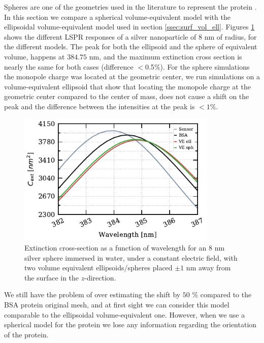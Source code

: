 Spheres are one of the geometries used in the literature to represent the protein \cite{SantiagoCordobaETal2011, UngerETal2009}. In this 
section we compare a spherical volume-equivalent model with the ellipsoidal volume-equivalent model used in section
\ref{ssec:surf_vol_ell}. Figures \ref{fig:sph_vs_ell_ve} shows the different LSPR responses of a silver nanoparticle of $8$ nm of radius, 
for the different models. The peak for both the ellipsoid and the sphere of equivalent volume, happens at $384.75$ nm, and the 
maximum extinction cross section is nearly the same for both cases (difference $<$0.5$\%$). For the sphere simulations 
the monopole charge was located at the geometric center, we run simulations on a volume-equivalent ellipsoid that show 
that locating the monopole charge at the geometric center compared to the center of mass, does not cause a shift on the peak 
and the difference between the intensities at the peak is $<1\%$.


\begin{figure} %
    \centering
    \includegraphics[width=0.85\textwidth]{two_ve_ell_sph_vs_BSA.pdf} 
    \caption{Extinction cross-section as a function of wavelength for an $8$ nm
    silver sphere immersed in water, under a constant electric field, with two volume equivalent 
    ellipsoids/spheres placed $\pm 1$ nm away from the surface in the $z$-direction.}
    \label{fig:sph_vs_ell_ve}
 \end{figure}

We still have the problem of over estimating the shift by $50$ $\%$ compared to the BSA protein original mesh, 
and at first sight we can consider this model comparable to the ellipsoidal volume-equivalent one. However, 
when we use a spherical model for the protein we lose any information regarding the orientation of the protein. 


